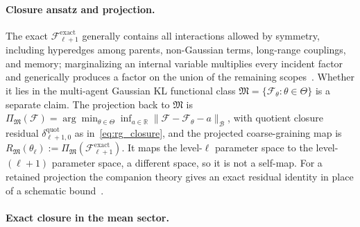 \documentclass[11pt]{article}
\begin{document}
\paragraph{Closure ansatz and projection.}
The exact $\mathcal{F}_{\ell+1}^{\mathrm{exact}}$ generally contains all interactions allowed by symmetry, including hyperedges among parents, non-Gaussian terms, long-range couplings, and memory; marginalizing an internal variable multiplies every incident factor and generically produces a factor on the union of the remaining scopes~\cite[Ch.~11]{DennisGaugeVFE2026}. Whether it lies in the multi-agent Gaussian KL functional class $\mathfrak{M} = \{\mathcal{F}_\theta : \theta \in \Theta\}$ is a separate claim. The projection back to $\mathfrak{M}$ is $\Pi_\mathfrak{M}(\mathcal{F}) = \arg\min_{\theta \in \Theta} \inf_{a \in \mathbb{R}}\|\mathcal{F} - \mathcal{F}_\theta - a\|_\mathcal{B}$, with quotient closure residual $\delta_{\ell+1,0}^{\mathrm{quot}}$ as in~\eqref{eq:rg_closure}, and the projected coarse-graining map is $R_\mathfrak{M}(\theta_\ell) := \Pi_\mathfrak{M}(\mathcal{F}_{\ell+1}^{\mathrm{exact}})$. It maps the level-$\ell$ parameter space to the level-$(\ell+1)$ parameter space, a different space, so it is not a self-map. For a retained projection the companion theory gives an exact residual identity in place of a schematic bound~\cite[Ch.~11]{DennisGaugeVFE2026}.

\paragraph{Exact closure in the mean sector.}
\end{document}

